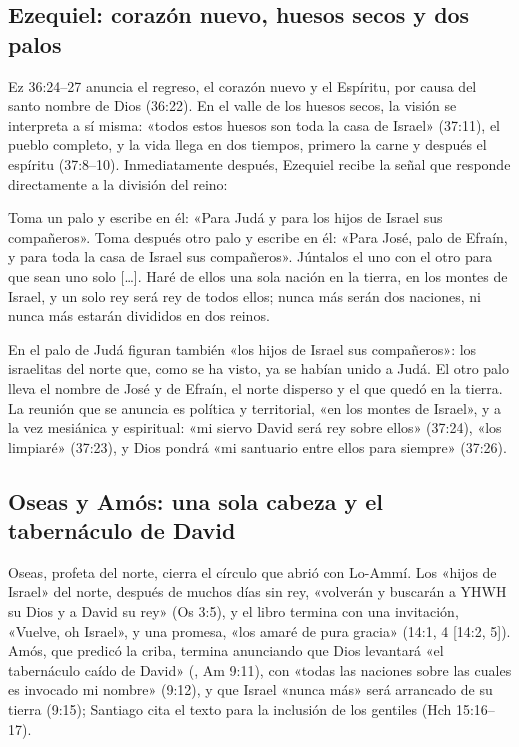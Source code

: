 \subsection{Ezequiel: corazón nuevo, huesos secos y dos palos}
Ez 36:24--27 anuncia el regreso, el corazón nuevo y el Espíritu, por causa del santo nombre de Dios (36:22). En el valle de los huesos secos, la visión se interpreta a sí misma: «todos estos huesos son toda la casa de Israel» (37:11), el pueblo completo, y la vida llega en dos tiempos, primero la carne y después el espíritu (37:8--10). Inmediatamente después, Ezequiel recibe la señal que responde directamente a la división del reino:
\begin{cita}Toma un palo y escribe en él: «Para Judá y para los hijos de Israel sus compañeros». Toma después otro palo y escribe en él: «Para José, palo de Efraín, y para toda la casa de Israel sus compañeros». Júntalos el uno con el otro para que sean uno solo [\ldots]. Haré de ellos una sola nación en la tierra, en los montes de Israel, y un solo rey será rey de todos ellos; nunca más serán dos naciones, ni nunca más estarán divididos en dos reinos.\end{cita}
En el palo de Judá figuran también «los hijos de Israel sus compañeros»: los israelitas del norte que, como se ha visto, ya se habían unido a Judá. El otro palo lleva el nombre de José y de Efraín, el norte disperso y el que quedó en la tierra. La reunión que se anuncia es política y territorial, «en los montes de Israel», y a la vez mesiánica y espiritual: «mi siervo David será rey sobre ellos» (37:24), «los limpiaré» (37:23), y Dios pondrá «mi santuario entre ellos para siempre» (37:26).

\subsection{Oseas y Amós: una sola cabeza y el tabernáculo de David}
Oseas, profeta del norte, cierra el círculo que abrió con Lo-Ammí. Los «hijos de Israel» del norte, después de muchos días sin rey, «volverán y buscarán a YHWH su Dios y a David su rey» (Os 3:5), y el libro termina con una invitación, «Vuelve, oh Israel», y una promesa, «los amaré de pura gracia» (14:1, 4 [14:2, 5]). Amós, que predicó la criba, termina anunciando que Dios levantará «el tabernáculo caído de David» (, Am 9:11), con «todas las naciones sobre las cuales es invocado mi nombre» (9:12), y que Israel «nunca más» será arrancado de su tierra (9:15); Santiago cita el texto para la inclusión de los gentiles (Hch 15:16--17).

